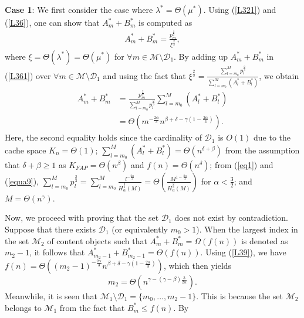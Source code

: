 \documentclass[10pt,journal,compsoc,onecolumn]{IEEEtran}
\begin{document}
{\bf Case 1}: We first consider the case where
$\lambda^*=\Theta(\mu^*)$.
Using (\ref{L321}) and (\ref{L36}), one can show that
$A_m^*+B_m^*$ is computed as
\begin{align}
\label{L361}
   A_m^*+B_m^* =\frac{ p^{\frac{2}{3}}_m}{\xi^{\frac{2}{3}}},
\end{align}
where $\xi=\Theta(\lambda^*)=\Theta(\mu^*)$ for $\forall m \in
\mathcal{M}\setminus \mathcal{D}_1$. By adding up $A_m^*+B_m^*$ in
(\ref{L361}) over $\forall m \in
\mathcal{M}\setminus\mathcal{D}_1$ and using the fact that
$\xi^{\frac{2}{3}} =\frac{
\sum_{l=m_0}^{M}p^{\frac{2}{3}}_l}{\sum_{l=m_0}^{M}(A_l^* +
B_l^*)}$, we obtain
\begin{align}
\label{L39} A_m^* + B_m^* &=\frac{
p^{\frac{2}{3}}_m}{\sum_{l=m_0}^{M}p^{\frac{2}{3}}_l}\sum_{l=m_0}^{M}(A_l^*
+
B_l^*)\nonumber\\&=\Theta\left(m^{-\frac{2\alpha}{3}}n^{\beta+\delta-\gamma\left(1-\frac{2\alpha}{3}\right)}\right).
\end{align}
Here, the second equality holds since the cardinality of
$\mathcal{D}_1$ is $O(1)$ due to the cache space $K_n=\Theta(1)$;
$\sum_{l=m_0}^{M}(A_l^* + B_l^*)=\Theta(n^{\delta+\beta})$ from
the assumption that $\delta+\beta\geq 1$ as
$K_{FAP}=\Theta\left(n^\beta\right)$ and
$f(n)=\Theta\left(n^\delta\right)$; from (\ref{eq1}) and
(\ref{equa9}), $\sum_{l=m_0}^{M}
p^{\frac{2}{3}}_l=\sum_{l=m_0}^{M}
\frac{l^{-\frac{2\alpha}{3}}}{H^{\frac{2}{3}}_{\alpha}(M)}=\Theta\left(\frac{M^{1-\frac{2\alpha}{3}}}{H^{\frac{2}{3}}_{\alpha}(M)}\right)$
for $\alpha<\frac{3}{2}$; and $M=\Theta\left(n^\gamma\right)$.\par
Now, we proceed with proving that the set $\mathcal{D}_1$ does not
exist by contradiction. Suppose that there exists $\mathcal{D}_1$
(or equivalently $m_0>1$). When the largest index in the set
$\mathcal{M}_2$ of content objects such that
$A_m^*+B_m^*=\Omega(f(n))$ is denoted as $m_2-1$, it follows that
$A_{m_2-1}^*+B_{m_2-1}^*=\Theta(f(n))$. Using (\ref{L39}), we have
$f(n)=\Theta\left((m_2-1)^{-\frac{2\alpha}{3}}n^{\beta+\delta-\gamma\left(1-\frac{2\alpha}{3}\right)}\right)$,
which then yields
\begin{equation}
\label{L390}
m_2=\Theta\left(n^{\gamma-(\gamma-\beta)\frac{3}{2\alpha}}\right).
\end{equation}
Meanwhile, it is seen that
$\mathcal{M}_1\setminus\mathcal{D}_1=\lbrace
m_0,...,m_2-1\rbrace$. This is because the set $\mathcal{M}_2$
belongs to $\mathcal{M}_1$ from the fact that $B_m^*\leq f(n)$. By
\end{document}
